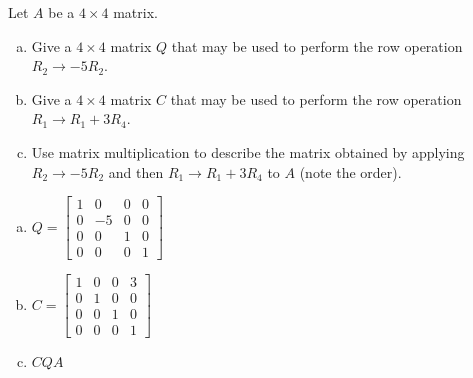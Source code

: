 
\begin{exerciseStatement}


Let \(A\) be a \(4 \times 4\) matrix.


\begin{enumerate}[(a)]
\item Give a \(4 \times 4\) matrix \(Q\) that may be used to perform the row operation \( R_2 \to -5R_2 \).
\item Give a \(4 \times 4\) matrix \(C\) that may be used to perform the row operation \( R_1 \to R_1 + 3R_4 \).
\item Use matrix multiplication to describe the matrix obtained by applying \( R_2 \to -5R_2 \) and then \( R_1 \to R_1 + 3R_4 \) to \(A\) (note the order). 
\end{enumerate}
    
\end{exerciseStatement}
    
\begin{exerciseAnswer} 

\begin{enumerate}[(a)]
\item \(Q= \left[\begin{array}{cccc}
1 & 0 & 0 & 0 \\
0 & -5 & 0 & 0 \\
0 & 0 & 1 & 0 \\
0 & 0 & 0 & 1
\end{array}\right] \)
\item \(C= \left[\begin{array}{cccc}
1 & 0 & 0 & 3 \\
0 & 1 & 0 & 0 \\
0 & 0 & 1 & 0 \\
0 & 0 & 0 & 1
\end{array}\right] \)
\item \(CQA\)
\end{enumerate}
    
\end{exerciseAnswer}
    
